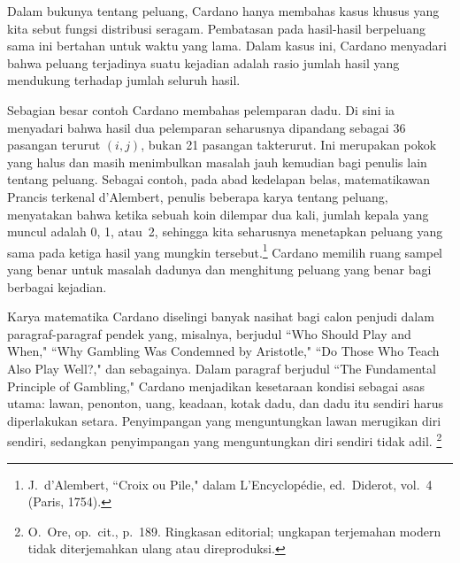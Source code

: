 Dalam bukunya tentang peluang, Cardano hanya membahas kasus khusus yang kita
sebut fungsi distribusi seragam.  Pembatasan pada hasil-hasil berpeluang sama ini
bertahan
untuk waktu yang lama.  Dalam kasus ini, Cardano menyadari bahwa
peluang terjadinya suatu kejadian adalah rasio jumlah hasil yang
mendukung terhadap jumlah seluruh hasil.

Sebagian besar contoh Cardano membahas pelemparan dadu.  Di sini ia menyadari bahwa
hasil
dua pelemparan seharusnya dipandang sebagai 36 pasangan terurut $(i,j)$,
bukan 21 pasangan takterurut.  Ini merupakan pokok yang halus dan masih
menimbulkan masalah jauh kemudian bagi penulis lain tentang peluang.  Sebagai contoh,
pada
abad kedelapan belas, matematikawan Prancis terkenal d'Alembert, penulis beberapa
karya tentang peluang, menyatakan bahwa ketika sebuah koin dilempar dua kali,
jumlah kepala yang muncul adalah 0, 1, atau~2, sehingga kita seharusnya
menetapkan peluang yang sama pada ketiga hasil yang mungkin
tersebut.\footnote{J.~d'Alembert, ``Croix ou Pile," dalam \emx
{L'Encyclop\'edie,}
ed.~Diderot, vol.~4 (Paris, 1754).}  Cardano memilih ruang sampel yang benar
untuk
masalah dadunya dan menghitung peluang yang benar bagi berbagai
kejadian.
\par
Karya matematika Cardano diselingi banyak nasihat bagi calon
penjudi dalam paragraf-paragraf pendek yang, misalnya, berjudul ``Who Should
Play
and When," ``Why Gambling Was Condemned by Aristotle," ``Do Those Who Teach
Also Play Well?," dan sebagainya. Dalam paragraf berjudul ``The Fundamental
Principle of Gambling," Cardano menjadikan kesetaraan kondisi sebagai asas
utama: lawan, penonton, uang, keadaan, kotak dadu, dan dadu itu sendiri harus
diperlakukan setara. Penyimpangan yang menguntungkan lawan merugikan diri
sendiri, sedangkan penyimpangan yang menguntungkan diri sendiri tidak adil.
\footnote{O.~Ore, op.\ cit., p.~189. Ringkasan editorial; ungkapan terjemahan
modern tidak diterjemahkan ulang atau direproduksi.}

